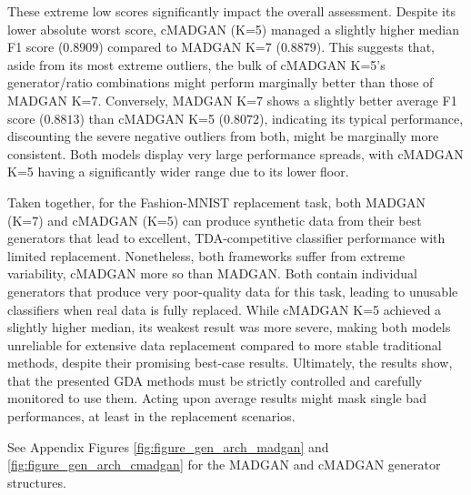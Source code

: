 These extreme low scores significantly impact the overall assessment. Despite its lower absolute worst score, cMADGAN (K=5) managed a slightly higher median F1 score ($0.8909$) compared to MADGAN K=7 ($0.8879$). This suggests that, aside from its most extreme outliers, the bulk of cMADGAN K=5's generator/ratio combinations might perform marginally better than those of MADGAN K=7. Conversely, MADGAN K=7 shows a slightly better average F1 score ($0.8813$) than cMADGAN K=5 ($0.8072$), indicating its typical performance, discounting the severe negative outliers from both, might be marginally more consistent. Both models display very large performance spreads, with cMADGAN K=5 having a significantly wider range due to its lower floor.

Taken together, for the Fashion-MNIST replacement task, both MADGAN (K=7) and cMADGAN (K=5) can produce synthetic data from their best generators that lead to excellent, TDA-competitive classifier performance with limited replacement. Nonetheless, both frameworks suffer from extreme variability, cMADGAN more so than MADGAN. Both contain individual generators that produce very poor-quality data for this task, leading to unusable classifiers when real data is fully replaced. While cMADGAN K=5 achieved a slightly higher median, its weakest result was more severe, making both models unreliable for extensive data replacement compared to more stable traditional methods, despite their promising best-case results. Ultimately, the results show, that the presented GDA methods must be strictly controlled and carefully monitored to use them. Acting upon average results might mask single bad performances, at least in the replacement scenarios.

See Appendix Figures \ref{fig:figure_gen_arch_madgan} and \ref{fig:figure_gen_arch_cmadgan} for the MADGAN and cMADGAN generator structures.

